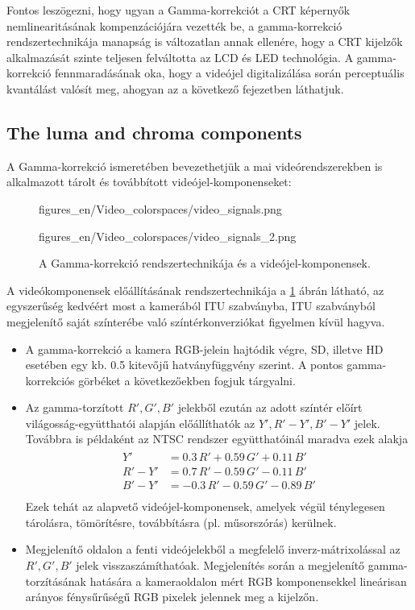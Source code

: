 \hspace{3mm}
Fontos leszögezni, hogy ugyan a Gamma-korrekciót a CRT képernyők nemlinearitásának kompenzációjára vezették be, a gamma-korrekció rendszertechnikája manapság is változatlan annak ellenére, hogy a CRT kijelzők alkalmazását szinte teljesen felváltotta az LCD és LED technológia.
A gamma-korrekció fennmaradásának oka, hogy a videójel digitalizálása során perceptuális kvantálást valósít meg, ahogyan az a következő fejezetben láthatjuk.

\subsection{The luma and chroma components}
A Gamma-korrekció ismeretében bevezethetjük a mai videórendszerekben is alkalmazott tárolt és továbbított videójel-komponenseket:
\begin{figure}[]
	\centering
	\begin{overpic}[width = 0.53\columnwidth ]{figures_en/Video_colorspaces/video_signals.png}
	\end{overpic}
	\hspace{2mm}
	\begin{overpic}[width = 0.44\columnwidth ]{figures_en/Video_colorspaces/video_signals_2.png}
	\end{overpic}
	\caption{A Gamma-korrekció rendszertechnikája és a videójel-komponensek.}
	\label{Fig:gamma_system}  
\end{figure}
A videókomponensek előállításának rendszertechnikája a \ref{Fig:gamma_system} ábrán látható, az egyszerűség kedvéért most a kamerából ITU szabványba, ITU szabványból megjelenítő saját színterébe való színtérkonverziókat figyelmen kívül hagyva.
\begin{itemize}
\item A gamma-korrekció a kamera RGB-jelein hajtódik végre, SD, illetve HD esetében egy kb. 0.5 kitevőjű hatványfüggvény szerint.
A pontos gamma-korrekciós görbéket a következőekben fogjuk tárgyalni.
\item Az gamma-torzított $R',G',B'$ jelekből ezután az adott színtér előírt világosság-együtthatói alapján előállíthatók az $Y', R'-Y', B'-Y'$ jelek.
Továbbra is példaként az NTSC rendszer együtthatóinál maradva ezek alakja
\begin{align}
\begin{split}
Y' &= 0.3 \, R' + 0.59 \, G' + 0.11 \, B' \\
R'-Y' &= 0.7 \, R' - 0.59 \, G' - 0.11 \, B' \\
B'-Y' &= -0.3 \, R' - 0.59 \, G' - 0.89 \, B' \\
\end{split}
\end{align}
Ezek tehát az alapvető videójel-komponensek, amelyek végül ténylegesen tárolásra, tömörítésre, továbbításra (pl. műsorszórás) kerülnek.
\item Megjelenítő oldalon a fenti videójelekből a megfelelő inverz-mátrixolással az $R', G', B'$ jelek visszaszámíthatóak.
Megjelenítés során a megjelenítő gamma-torzításának hatására a kameraoldalon mért RGB komponensekkel lineárisan arányos fénysűrűségű RGB pixelek jelennek meg a kijelzőn.
\end{itemize}
